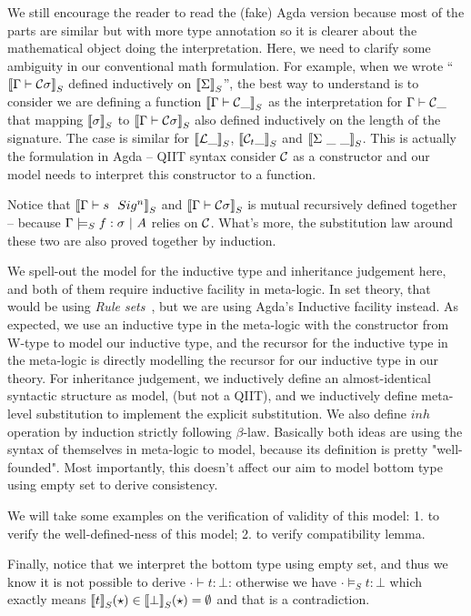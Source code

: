We still encourage the reader to read the (fake) Agda version because most of the parts are similar but with more type annotation so it is clearer about the mathematical object doing the interpretation. Here, we need to clarify some ambiguity in our conventional math formulation. For example, when we wrote ``$\denotesS{\goodType{\Gamma}{\cC \sigma}{}}$ defined inductively on $\denotesS{\Sigma}$'', the best way to understand is to consider we are defining a function $\denotesS{\goodType{\Gamma}{\cC \_}{}}$ as the interpretation for $\goodType{\Gamma}{\cC \_}{}$ that mapping $\denotesS{\sigma}$ to $\denotesS{\goodType{\Gamma}{\cC \sigma}{}}$ also defined inductively on the length of the signature. The case is similar for $\denotesS{\cL \_}$, $\denotesS{\cCt \_}$ and  $\denotesS{\Sigma \ \_ \ \_}$. This is actually the formulation in Agda -- QIIT syntax consider $\cC$ as a constructor and our model needs to interpret this constructor to a function. 

Notice that $\denotesS{\goodSig{\Gamma}{s}{n}}$ and $\denotesS{\goodType{\Gamma}{\cC\sigma}{i}}$ is mutual recursively defined together -- because $\goodSealS{\Gamma}{f}{\sigma}{A}$ relies on $\cC$. What's more, the substitution law around these two are also proved together by induction.

We spell-out the model for the inductive type and inheritance judgement here, and both of them require inductive facility in meta-logic. In set theory, that would be using \textit{Rule sets}~\citep{timany2017consistency,aczel1998relating}, but we are using Agda's Inductive facility instead. 
As expected, we use an inductive type in the meta-logic with the constructor from W-type to model our inductive type, and the recursor for the inductive type in the meta-logic is directly modelling the recursor for our inductive type in our theory. For inheritance judgement, we inductively define an almost-identical syntactic structure as model, (but not a QIIT), and we inductively define meta-level substitution to implement the explicit substitution. We also define $inh$ operation by induction strictly following $\beta$-law. Basically both ideas are using the syntax of themselves in meta-logic to model, because its definition is pretty "well-founded". Most importantly, this doesn't affect our aim to model bottom type using empty set to derive consistency.


We will take some examples on the verification of validity of this model: 1. to verify the well-defined-ness of this model; 2. to verify compatibility lemma.


Finally, notice that we interpret the bottom type using empty set, and thus we know it is not possible to derive $\cdot \vdash t : \bot$: otherwise we have $\cdot \models_S t : \bot$ which exactly means $\denotesS{t}(\star) \in \denotesS{\bot}(\star) = \emptyset$ 
and that is a contradiction.